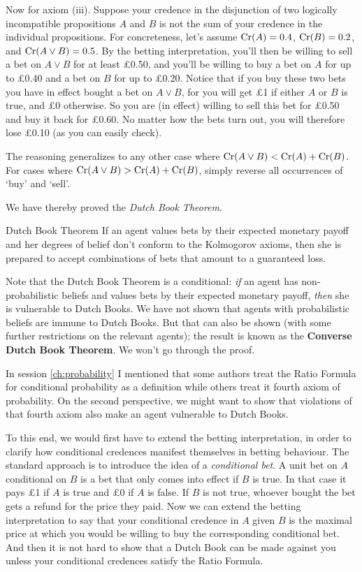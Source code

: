 Now for axiom (iii). Suppose your credence in the disjunction of two
logically incompatible propositions $A$ and $B$ is not the sum of your
credence in the individual propositions. For concreteness, let's
assume $\text{Cr}(A) = 0.4$, $\text{Cr}(B) = 0.2$, and $\text{Cr}(A \lor B) = 0.5$. By
the betting interpretation, you'll then be willing to sell a bet on $A
\lor B$ for at least £0.50, and you'll be willing to buy a bet on $A$
for up to £0.40 and a bet on $B$ for up to £0.20. Notice that if you
buy these two bets you have in effect bought a bet on $A \lor B$, for
you will get £1 if either $A$ or $B$ is true, and £0 otherwise. So you
are (in effect) willing to sell this bet for £0.50 and buy it back for
£0.60. No matter how the bets turn out, you will therefore lose £0.10
(as you can easily check).

The reasoning generalizes to any other case where $\text{Cr}(A \lor B) <
\text{Cr}(A) + \text{Cr}(B)$. For cases where $\text{Cr}(A \lor B) > \text{Cr}(A) + \text{Cr}(B)$,
simply reverse all occurrences of `buy' and `sell'.

We have thereby proved the \emph{Dutch Book Theorem}.

\begin{genericthm}{Dutch Book Theorem}
  If an agent values bets by their expected monetary payoff and her
  degrees of belief don't conform to the Kolmogorov axioms, then she
  is prepared to accept combinations of bets that amount to a
  guaranteed loss. 
\end{genericthm}

Note that the Dutch Book Theorem is a conditional: \emph{if} an agent
has non-probabilistic beliefs and values bets by their expected
monetary payoff, \emph{then} she is vulnerable to Dutch Books. We have
not shown that agents with probabilistic beliefs are immune to Dutch
Books. But that can also be shown (with some further
restrictions on the relevant agents); the result is known as the
\textbf{Converse Dutch Book Theorem}. We won't go through the proof.

In session \ref{ch:probability} I mentioned that some authors treat
the Ratio Formula for conditional probability as a definition while
others treat it fourth axiom of probability. On the second
perspective, we might want to show that violations of that fourth
axiom also make an agent vulnerable to Dutch Books.

To this end, we would first have to extend the betting interpretation,
in order to clarify how conditional credences manifest themselves in
betting behaviour. The standard approach is to introduce the idea of a
\emph{conditional bet}. A unit bet on $A$ conditional on $B$ is a bet
that only comes into effect if $B$ is true. In that case it pays £1 if
$A$ is true and £0 if $A$ is false. If $B$ is not true, whoever bought
the bet gets a refund for the price they paid. Now we can extend the
betting interpretation to say that your conditional credence in $A$
given $B$ is the maximal price at which you would be willing to buy the
corresponding conditional bet. And then it is not hard to show that a
Dutch Book can be made against you unless your conditional credences
satisfy the Ratio Formula.

